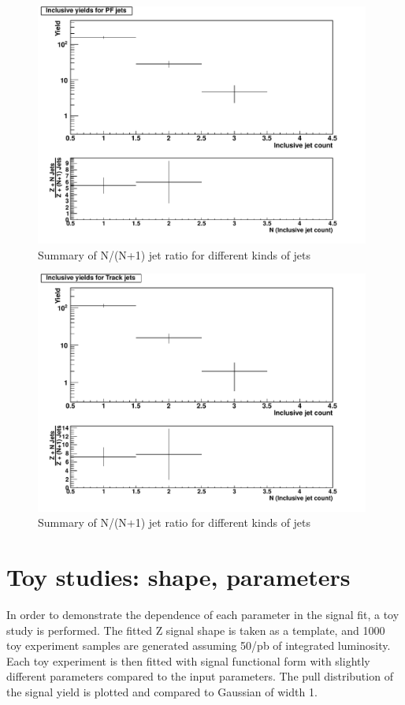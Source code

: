 \documentclass[10pt,a4paper,onecolumn]{article}
\begin{document}
\begin{figure}
   \includegraphics[width=110mm]{FinalPlot_FloatAll_PF.pdf}
   \caption{Summary of N/(N+1) jet ratio for different kinds of jets}
   \label{Figure_RatioFromDataPFJet}
\end{figure}

\begin{figure}
   \includegraphics[width=110mm]{FinalPlot_FloatAll_Track.pdf}
   \caption{Summary of N/(N+1) jet ratio for different kinds of jets}
   \label{Figure_RatioFromDataTrackJet}
\end{figure}


\section{Toy studies: shape, parameters}

In order to demonstrate the dependence of each parameter in the signal fit, a toy study is performed.
The fitted Z signal shape is taken as a template, and 1000 toy experiment samples are generated assuming 50/pb of integrated luminosity.
Each toy experiment is then fitted with signal functional form with slightly different parameters compared to the input parameters.
The pull distribution of the signal yield is plotted and compared to Gaussian of width 1.
\end{document}
